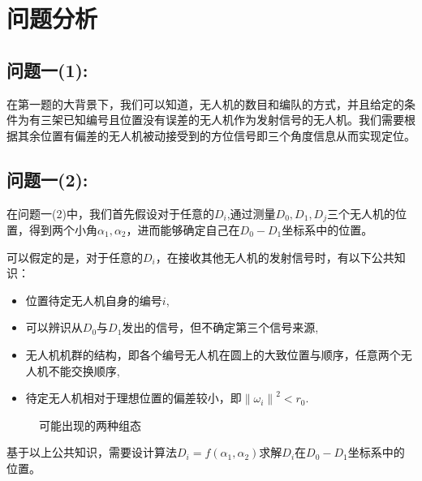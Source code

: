 \documentclass[withoutpreface,bwprint]{cumcmthesis} %
\begin{document}
	\section{问题分析}
		\subsection{问题一(1):}
		在第一题的大背景下，我们可以知道，无人机的数目和编队的方式，并且给定的条件为有三架已知编号且位置没有误差的无人机作为发射信号的无人机。我们需要根据其余位置有偏差的无人机被动接受到的方位信号即三个角度信息从而实现定位。
		\subsection{问题一(2):}
		在问题一(2)中，我们首先假设对于任意的$D_i$,通过测量$D_0,D_1,D_j$三个无人机的位置，得到两个小角$\alpha_1,\alpha_2$，进而能够确定自己在$D_0 - D_1$坐标系中的位置。
		
		可以假定的是，对于任意的$D_i$，在接收其他无人机的发射信号时，有以下公共知识：
		\begin{itemize}
			\item	位置待定无人机自身的编号$i$,
			\item	可以辨识从$D_0$与$D_1$发出的信号，但不确定第三个信号来源,
			\item	无人机机群的结构，即各个编号无人机在圆上的大致位置与顺序，任意两个无人机不能交换顺序,
			\item 	待定无人机相对于理想位置的偏差较小，即$ {\lVert \omega_i \rVert}^2 < r_0 $.
		\end{itemize}
		\begin{figure}[htb]
			\centering
			\caption{可能出现的两种组态}
			\label{fig1}
		\end{figure}
		基于以上公共知识，需要设计算法$D_i = f(\alpha_1, \alpha_2)$求解$D_i$在$D_0 - D_1$坐标系中的位置。
\end{document}
